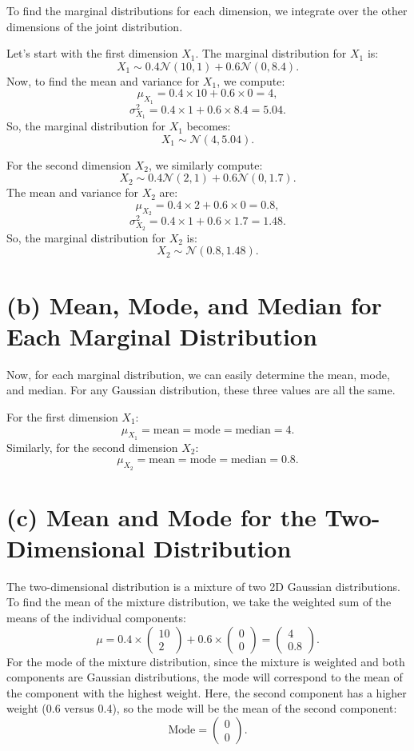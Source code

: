 \documentclass[12pt]{article}
\begin{document}
To find the marginal distributions for each dimension, we integrate over the other dimensions of the joint distribution. 

Let’s start with the first dimension \( X_1 \). The marginal distribution for \( X_1 \) is:
\[
X_1 \sim 0.4 \mathcal{N}(10, 1) + 0.6 \mathcal{N}(0, 8.4).
\]
Now, to find the mean and variance for \( X_1 \), we compute:
\[
\mu_{X_1} = 0.4 \times 10 + 0.6 \times 0 = 4,
\]
\[
\sigma^2_{X_1} = 0.4 \times 1 + 0.6 \times 8.4 = 5.04.
\]
So, the marginal distribution for \( X_1 \) becomes:
\[
X_1 \sim \mathcal{N}(4, 5.04).
\]

For the second dimension \( X_2 \), we similarly compute:
\[
X_2 \sim 0.4 \mathcal{N}(2, 1) + 0.6 \mathcal{N}(0, 1.7).
\]
The mean and variance for \( X_2 \) are:
\[
\mu_{X_2} = 0.4 \times 2 + 0.6 \times 0 = 0.8,
\]
\[
\sigma^2_{X_2} = 0.4 \times 1 + 0.6 \times 1.7 = 1.48.
\]
So, the marginal distribution for \( X_2 \) is:
\[
X_2 \sim \mathcal{N}(0.8, 1.48).
\]

\section*{(b) Mean, Mode, and Median for Each Marginal Distribution}

Now, for each marginal distribution, we can easily determine the mean, mode, and median. For any Gaussian distribution, these three values are all the same.

For the first dimension \( X_1 \):
\[
\mu_{X_1} = \text{mean} = \text{mode} = \text{median} = 4.
\]
Similarly, for the second dimension \( X_2 \):
\[
\mu_{X_2} = \text{mean} = \text{mode} = \text{median} = 0.8.
\]

\section*{(c) Mean and Mode for the Two-Dimensional Distribution}

The two-dimensional distribution is a mixture of two 2D Gaussian distributions. To find the mean of the mixture distribution, we take the weighted sum of the means of the individual components:
\[
\mu = 0.4 \times \begin{pmatrix} 10 \\ 2 \end{pmatrix} + 0.6 \times \begin{pmatrix} 0 \\ 0 \end{pmatrix} = \begin{pmatrix} 4 \\ 0.8 \end{pmatrix}.
\]
For the mode of the mixture distribution, since the mixture is weighted and both components are Gaussian distributions, the mode will correspond to the mean of the component with the highest weight. Here, the second component has a higher weight (0.6 versus 0.4), so the mode will be the mean of the second component:
\[
\text{Mode} = \begin{pmatrix} 0 \\ 0 \end{pmatrix}.
\]
\end{document}

